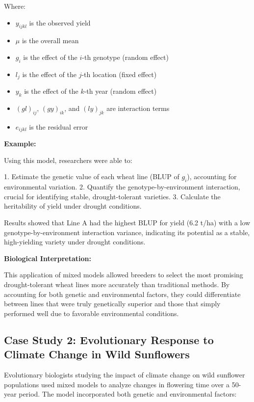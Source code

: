 \documentclass[12pt,a4paper]{article}
\newenvironment{example}[1][]
{\begin{basebox}[linecolor=uqgold]
\textbf{\color{uqgold}Example:} \textit{#1}\par\noindent\ignorespaces}
{\end{basebox}}
\newenvironment{interpretation}[1][]
{\begin{basebox}[linecolor=uqgreen]
\textbf{\color{uqgreen}Biological Interpretation:} \textit{#1}\par\noindent\ignorespaces}
{\end{basebox}}
\begin{document}
Where:
\begin{itemize}
    \item $y_{ijkl}$ is the observed yield
    \item $\mu$ is the overall mean
    \item $g_i$ is the effect of the $i$-th genotype (random effect)
    \item $l_j$ is the effect of the $j$-th location (fixed effect)
    \item $y_k$ is the effect of the $k$-th year (random effect)
    \item $(gl)_{ij}$, $(gy)_{ik}$, and $(ly)_{jk}$ are interaction terms
    \item $e_{ijkl}$ is the residual error
\end{itemize}

\begin{example}
Using this model, researchers were able to:

1. Estimate the genetic value of each wheat line (BLUP of $g_i$), accounting for environmental variation.
2. Quantify the genotype-by-environment interaction, crucial for identifying stable, drought-tolerant varieties.
3. Calculate the heritability of yield under drought conditions.

Results showed that Line A had the highest BLUP for yield (6.2 t/ha) with a low genotype-by-environment interaction variance, indicating its potential as a stable, high-yielding variety under drought conditions.
\end{example}

\begin{interpretation}
This application of mixed models allowed breeders to select the most promising drought-tolerant wheat lines more accurately than traditional methods. By accounting for both genetic and environmental factors, they could differentiate between lines that were truly genetically superior and those that simply performed well due to favorable environmental conditions.
\end{interpretation}

\subsection{Case Study 2: Evolutionary Response to Climate Change in Wild Sunflowers}

Evolutionary biologists studying the impact of climate change on wild sunflower populations used mixed models to analyze changes in flowering time over a 50-year period. The model incorporated both genetic and environmental factors:
\end{document}
